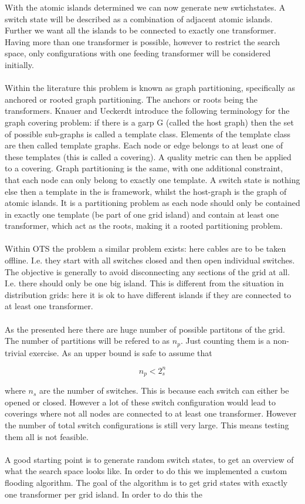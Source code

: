 With the atomic islands determined we can now generate new swtichstates.
A switch state will be described as a combination of adjacent atomic
islands. Further we want all the islands to be connected to 
exactly one transformer. Having more than one transformer is possible, however to
restrict the search space, only configurations with one feeding transformer
will be considered initially.\\
\\
Within the literature this problem is known as graph partitioning, specifically
as anchored or rooted graph partitioning\autocite{graph_partitioning}. The anchors
or roots being the transformers. Knauer and Ueckerdt\autocite{graph_covering_terminology}
introduce the following terminology for the graph covering problem: if there is a garp G (called
the host graph) then
the set of possible sub-graphs is called a template class. Elements of the 
template class are then called template graphs. Each node or edge belongs to at least
one of these templates (this is called a covering). A quality metric can then be applied to a covering.
Graph partitioning is the same, with one additional constraint, that each node can only belong
to exactly one template. A switch state is nothing else then a template in the is framework, whilst
the host-graph is the graph of atomic islands. It is a partitioning problem as each node should only
be contained in exactly one template (be part of one grid island) and contain at least
one transformer, which act as the roots, making it a rooted partitioning problem.\\
\\
Within OTS the problem a similar problem exists: here cables
are to be taken offline. I.e. they start with all switches closed and then open
individual switches. The objective is generally to avoid disconnecting any
sections of the grid at all. I.e. there should only be one big island. This is different
from the situation in distribution grids: here it is ok to have different islands if they
are connected to at least one transformer.\\
\\
As the presented here there are huge number of possible partitons of the grid.
The number of partitions will be refered to as $n_p$.
Just counting them is a non-trivial exercise. As an upper bound is safe
to assume that

\begin{equation}
    n_p < 2^n_s 
    \label{eq:sw_exp:upper_bound1}
\end{equation}

where $n_{s}$ are the number
of switches. This is because each switch can either be opened or closed. However
a lot of these switch configuration would lead to coverings where not all nodes
are connected to at least one transformer. However the number of total switch
configurations is still very large. This means testing them all is not feasible.\\
\\
A good starting point is to generate random switch states, to get an overview of what the search
space looks like. In order to do this we implemented a custom flooding algorithm. The goal
of the algorithm is to get grid states with exactly one transformer per grid island.
In order to do this the 